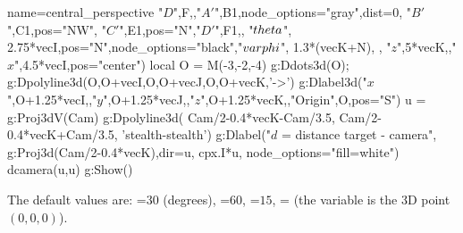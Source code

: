 \begin{center}
\begin{luadraw}{name=central_perspective}
"$D$",F,{},"$A'$",B1,{node_options="gray",dist=0}, "$B'$",C1,{pos="NW"}, "$C'$",E1,{pos="N"},"$D'$",F1,{}, "$\\theta$", 2.75*vecI,{pos="N",node_options="black"},"$\\varphi$", 1.3*(vecK+N), {}, "$z$",5*vecK,{},"$x$",4.5*vecI,{pos="center"})
local O = M(-3,-2,-4)
g:Ddots3d(O); g:Dpolyline3d({{O,O+vecI},{O,O+vecJ},{O,O+vecK}},'->')
g:Dlabel3d("$x$",O+1.25*vecI,{},"$y$",O+1.25*vecJ,{},"$z$",O+1.25*vecK,{},"Origin",O,{pos="S"})
u = g:Proj3dV(Cam)
g:Dpolyline3d( {Cam/2-0.4*vecK-Cam/3.5, Cam/2-0.4*vecK+Cam/3.5}, 'stealth-stealth')
g:Dlabel("$d$ = distance target - camera", g:Proj3d(Cam/2-0.4*vecK),{dir={u, cpx.I*u}, node_options="fill=white"})
dcamera(u,u)
g:Show()
\end{luadraw}
\end{center}

The default values ​​are: =$30$ (degrees), =$60$, =$15$, = (the variable  is the 3D point $(0,0,0)$).

